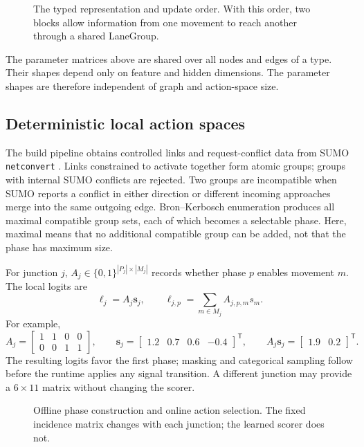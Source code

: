 \documentclass[10pt,a4paper]{article}
\begin{document}
\begin{figure}[H]
  \centering
  \resizebox{0.64\linewidth}{!}{}
  \caption{The typed representation and update order. With this order, two blocks allow information from one movement to reach another through a shared LaneGroup.}
  \label{fig:representation}
\end{figure}
\FloatBarrier

The parameter matrices above are shared over all nodes and edges of a type.
Their shapes depend only on feature and hidden dimensions.
The parameter shapes are therefore independent of graph and action-space size.

\subsection{Deterministic local action spaces}

The build pipeline obtains controlled links and request-conflict data from SUMO \texttt{netconvert} \cite{alvarezlopez2018sumo}.
Links constrained to activate together form atomic groups; groups with internal SUMO conflicts are rejected.
Two groups are incompatible when SUMO reports a conflict in either direction or different incoming approaches merge into the same outgoing edge.
Bron--Kerbosch enumeration \cite{bron1973cliques} produces all maximal compatible group sets, each of which becomes a selectable phase.
Here, maximal means that no additional compatible group can be added, not that the phase has maximum size.

For junction \(j\), \(A_j\in\{0,1\}^{|P_j|\times|M_j|}\) records whether phase \(p\) enables movement \(m\).
The local logits are
\[
\boldsymbol\ell_j=A_j\mathbf s_j,
\qquad
\ell_{j,p}=\sum_{m\in M_j}A_{j,p,m}s_m.
\]
For example,
\[
A_j=
\begin{bmatrix}1&1&0&0\\0&0&1&1\end{bmatrix},\qquad
\mathbf s_j=
\begin{bmatrix}1.2&0.7&0.6&-0.4\end{bmatrix}^{\mathsf T},\qquad
A_j\mathbf s_j=
\begin{bmatrix}1.9&0.2\end{bmatrix}^{\mathsf T}.
\]
The resulting logits favor the first phase; masking and categorical sampling follow before the runtime applies any signal transition.
A different junction may provide a \(6\times11\) matrix without changing the scorer.

\begin{figure}[H]
  \centering
  \resizebox{0.78\linewidth}{!}{}
  \caption{Offline phase construction and online action selection. The fixed incidence matrix changes with each junction; the learned scorer does not.}
  \label{fig:phase-interface}
\end{figure}
\FloatBarrier
\end{document}

